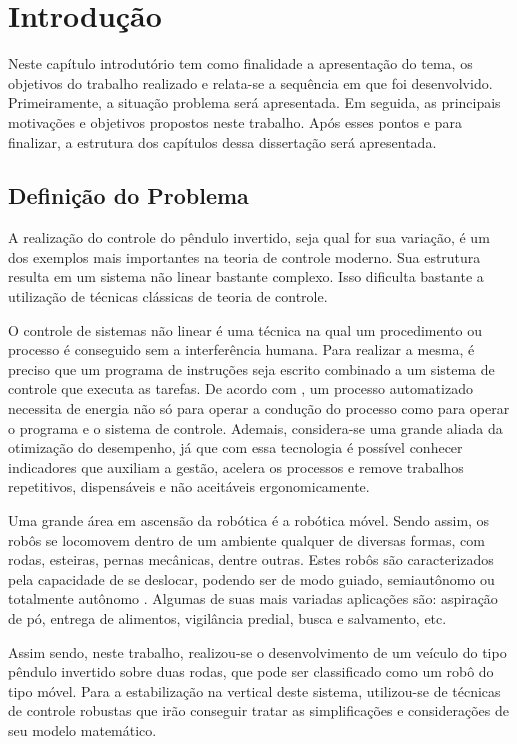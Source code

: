 \chapter{Introdução}\label{cap:Intro}

Neste capítulo introdutório tem como finalidade a apresentação do tema, os objetivos do trabalho realizado e relata-se a sequência em que foi desenvolvido. Primeiramente, a situação problema será apresentada. Em seguida, as principais motivações e objetivos propostos neste trabalho. Após esses pontos e para finalizar, a estrutura dos capítulos dessa dissertação será apresentada.

\section{Definição do Problema}

A realização do controle do pêndulo invertido, seja qual for sua variação, é um dos exemplos mais importantes na teoria de controle moderno. Sua estrutura resulta em um sistema não linear bastante complexo. Isso dificulta bastante a utilização de técnicas clássicas de teoria de controle.

O controle de sistemas não linear é uma técnica na qual um procedimento ou processo é conseguido sem a interferência humana. Para realizar a mesma, é preciso que um programa de instruções seja escrito  combinado a um sistema de controle que executa as tarefas. De acordo com \cite{Groover:11}, um processo automatizado necessita de energia não só para operar a condução do processo como para operar o programa e o sistema de controle. Ademais, considera-se uma grande aliada da otimização do desempenho, já que com essa tecnologia é possível conhecer indicadores que auxiliam a gestão, acelera os processos e remove trabalhos repetitivos, dispensáveis e não aceitáveis ergonomicamente.

Uma grande área em ascensão da robótica é a robótica móvel. Sendo assim, os robôs se locomovem dentro de um ambiente qualquer de diversas formas, com rodas, esteiras, pernas mecânicas, dentre outras. Estes robôs são caracterizados pela capacidade de se deslocar, podendo ser de modo guiado, semiautônomo ou totalmente autônomo \citep{Jung:05}. Algumas de suas mais variadas aplicações são: aspiração de pó, entrega de alimentos, vigilância predial, busca e salvamento, etc.

Assim sendo, neste trabalho, realizou-se o desenvolvimento de um veículo do tipo pêndulo invertido sobre duas rodas, que pode ser classificado como um robô do tipo móvel. Para a estabilização na vertical deste sistema, utilizou-se de técnicas de controle robustas que irão conseguir tratar as simplificações e considerações de seu modelo matemático. 

